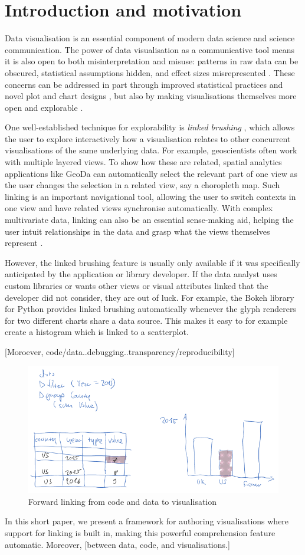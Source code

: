 \section{Introduction and motivation}

Data visualisation is an essential component of modern data science and science
communication. The power of data visualisation as a communicative tool means it
is also open to both misinterpretation and misuse: patterns in raw data can be
obscured, statistical assumptions hidden, and effect sizes misrepresented
\cite{weissgerber15}. These concerns can be addressed in part through improved
statistical practices and novel plot and chart designs \cite{allen19}, but also
by making visualisations themselves more open and explorable
\cite{dragicevic19}.

One well-established technique for explorability is \emph{linked brushing}
\cite{fisherkeller75,becker87,buja91}, which allows the user to explore
interactively how a visualisation relates to other concurrent visualisations of
the same underlying data. For example, geoscientists often work with multiple
layered views. To show how these are related, spatial analytics applications
like GeoDa \cite{anselin06} can automatically select the relevant part of one
view as the user changes the selection in a related view, say a choropleth map.
Such linking is an important navigational tool, allowing the user to switch
contexts in one view and have related views synchronise automatically. With
complex multivariate data, linking can also be an essential sense-making aid,
helping the user intuit relationships in the data and grasp what the views
themselves represent \cite{he18}.

However, the linked brushing feature is usually only available if it was
specifically anticipated by the application or library developer. If the data
analyst uses custom libraries or wants other views or visual attributes linked
that the developer did not consider, they are out of luck. For example, the
Bokeh library for Python \cite{jolly18} provides linked brushing automatically
whenever the glyph renderers for two different charts share a data source. This
makes it easy to for example create a histogram which is linked to a
scatterplot.

[Moroever, code/data..debugging..transparency/reproducibility]

\begin{figure}[H]
\includegraphics[scale=0.35]{image/chart-fwd}
\caption{Forward linking from code and data to visualisation}
\end{figure}

In this short paper, we present a framework for authoring visualisations where
support for linking is built in, making this powerful comprehension feature
automatic. Moreover, [between data, code, and visualisations.]
